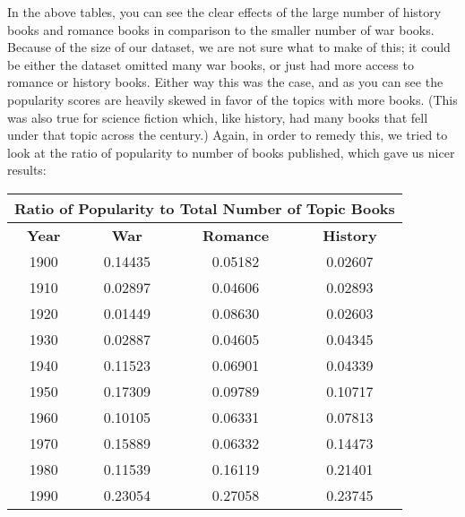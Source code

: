 \documentclass[twoside]{article}
\begin{document}
\begin{multicols}{2}
    In the above tables, you can see the clear effects of the large number of history books and romance books in comparison to the smaller number of war books. Because of the size of our dataset, we are not sure what to make of this; it could be either the dataset omitted many war books, or just had more access to romance or history books. Either way this was the case, and as you can see the popularity scores are heavily skewed in favor of the topics with more books. (This was also true for science fiction which, like history, had many books that fell under that topic across the century.) Again, in order to remedy this, we tried to look at the ratio of popularity to number of books published, which gave us nicer results:
    
\end{multicols}
\newpage

\begin{table}[h]
\centering   
    \begin{tabular}{|c|c|c|c|}
    \hline
    \multicolumn{4}{|c|}{Ratio of Popularity to Total Number of Topic Books} \\
    \hline
    \textbf{Year} & \textbf{War} & \textbf{Romance} & \textbf{History} \\
    \hline
    1900 & 0.14435 & 0.05182 & 0.02607 \\
    \hline
    1910 & 0.02897 & 0.04606 & 0.02893 \\
    \hline 
    1920 & 0.01449 & 0.08630 & 0.02603 \\
    \hline 
    1930 & 0.02887 & 0.04605 & 0.04345 \\
    \hline
    1940 & 0.11523 & 0.06901 & 0.04339 \\
    \hline
    1950 & 0.17309 & 0.09789 & 0.10717 \\
    \hline
    1960 & 0.10105 & 0.06331 & 0.07813 \\
    \hline 
    1970 & 0.15889 & 0.06332 & 0.14473 \\
    \hline
    1980 & 0.11539 & 0.16119 & 0.21401 \\
    \hline 
    1990 & 0.23054 & 0.27058 & 0.23745 \\
    \hline
    \end{tabular}

\end{table}
\end{document}
